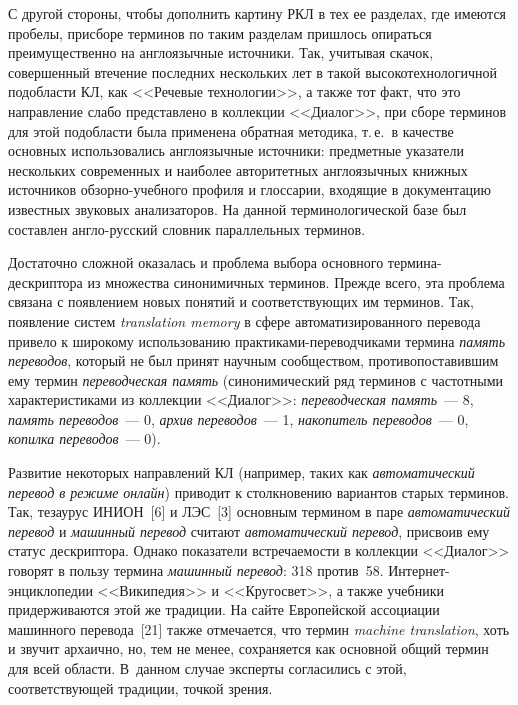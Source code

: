 \begin{multicols}{2}
  С другой стороны, чтобы дополнить картину РКЛ в тех ее разделах, где имеются пробелы, 
при\linebreak сборе терминов по таким разделам пришлось опираться преимущественно на 
англоязычные источники. Так, учитывая скачок, совершенный в\linebreak течение последних 
нескольких лет в такой высокотехнологичной подобласти КЛ, как <<Речевые технологии>>, 
а также тот факт, что это направление слабо представлено в коллекции <<Диалог>>, при 
сборе терминов для этой подобласти была применена обратная методика, т.\,е.\ в качестве 
основных использовались англоязычные источники: предметные указатели нескольких 
современных и наиболее авторитетных англоязычных книжных источников 
  обзорно-учебного профиля и глоссарии, входящие в документацию известных звуковых 
анализаторов. На данной терминологической базе был составлен англо-русский словник 
параллельных терминов.
  
  Достаточно сложной оказалась и проблема выбора основного термина-дескриптора из 
множества синонимичных терминов. Прежде всего, эта проблема связана с появлением 
новых понятий и соответствующих им терминов. Так, появление систем \textit{translation 
memory} в сфере автоматизированного перевода привело к широкому использованию 
практиками-переводчиками термина \textit{память переводов}, который не был принят 
научным сообществом, противопоставившим ему термин \textit{переводческая память} 
(синонимический ряд терминов с частотными характеристиками из коллекции <<Диалог>>: 
\textit{переводческая память}~--- 8, \textit{память переводов}~--- 0, \textit{архив 
переводов}~--- 1, \textit{накопитель переводов}~--- 0, \textit{копилка переводов}~--- 0).
  
  Развитие некоторых направлений КЛ (например, таких как \textit{автоматический 
перевод в режиме онлайн}) приводит к столкновению вариантов старых терминов. Так, 
тезаурус ИНИОН~[6] и ЛЭС~[3] основным термином в паре \textit{автоматический 
перевод} и \textit{машинный перевод} считают \textit{автоматический перевод}, присвоив 
ему статус дескриптора. Однако показатели встречаемости в коллекции <<Диалог>> говорят 
в пользу термина \textit{машинный перевод}: 318 против~58. Интернет-энциклопедии 
<<Википедия>> и <<Кругосвет>>, а также учебники придерживаются этой же традиции. На 
сайте Европейской ассоциации машинного перевода~[21] также отмечается, что термин 
\textit{machine translation}, хоть и звучит архаично, но, тем не менее, сохраняется как 
основной общий термин для всей области. В~данном случае эксперты согласились с этой, 
соответствующей традиции, точкой зрения.
   

\end{multicols}
